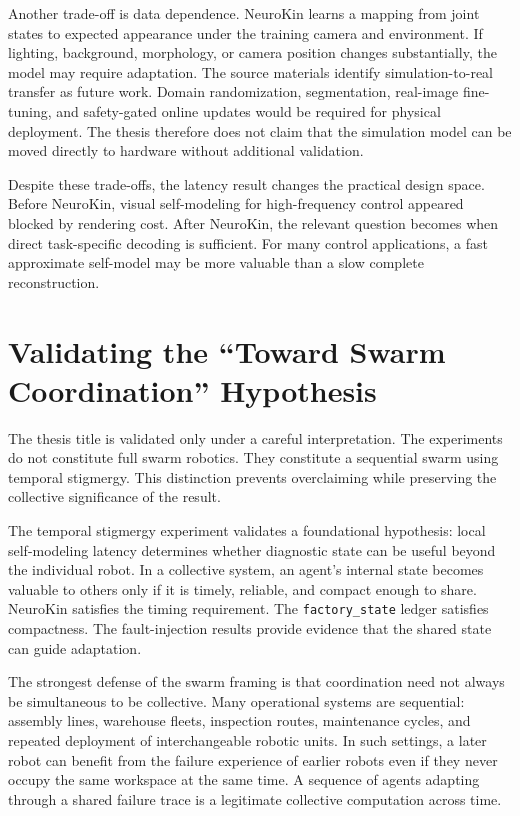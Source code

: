 \documentclass[12pt,a4paper,oneside]{report}
\begin{document}
Another trade-off is data dependence. NeuroKin learns a mapping from joint states to expected appearance under the training camera and environment. If lighting, background, morphology, or camera position changes substantially, the model may require adaptation. The source materials identify simulation-to-real transfer as future work. Domain randomization, segmentation, real-image fine-tuning, and safety-gated online updates would be required for physical deployment. The thesis therefore does not claim that the simulation model can be moved directly to hardware without additional validation.

Despite these trade-offs, the latency result changes the practical design space. Before NeuroKin, visual self-modeling for high-frequency control appeared blocked by rendering cost. After NeuroKin, the relevant question becomes when direct task-specific decoding is sufficient. For many control applications, a fast approximate self-model may be more valuable than a slow complete reconstruction.

\section{Validating the ``Toward Swarm Coordination'' Hypothesis}

The thesis title is validated only under a careful interpretation. The experiments do not constitute full swarm robotics. They constitute a sequential swarm using temporal stigmergy. This distinction prevents overclaiming while preserving the collective significance of the result.

The temporal stigmergy experiment validates a foundational hypothesis: local self-modeling latency determines whether diagnostic state can be useful beyond the individual robot. In a collective system, an agent's internal state becomes valuable to others only if it is timely, reliable, and compact enough to share. NeuroKin satisfies the timing requirement. The \texttt{factory\_state} ledger satisfies compactness. The fault-injection results provide evidence that the shared state can guide adaptation.

The strongest defense of the swarm framing is that coordination need not always be simultaneous to be collective. Many operational systems are sequential: assembly lines, warehouse fleets, inspection routes, maintenance cycles, and repeated deployment of interchangeable robotic units. In such settings, a later robot can benefit from the failure experience of earlier robots even if they never occupy the same workspace at the same time. A sequence of agents adapting through a shared failure trace is a legitimate collective computation across time.
\end{document}
